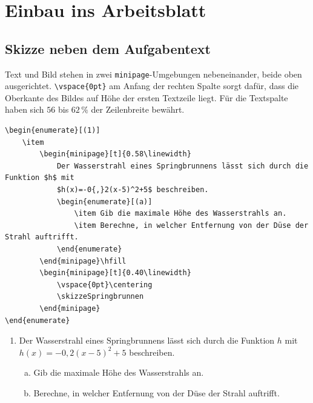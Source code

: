 \section{Einbau ins Arbeitsblatt}


\subsection{Skizze neben dem Aufgabentext}

Text und Bild stehen in zwei \texttt{minipage}-Umgebungen nebeneinander, beide oben ausgerichtet. \texttt{\textbackslash vspace\{0pt\}} am Anfang der rechten Spalte sorgt dafür, dass die Oberkante des Bildes auf Höhe der ersten Textzeile liegt. Für die Textspalte haben sich $56$ bis $62\,\%$ der Zeilenbreite bewährt.

\begin{lstlisting}[style=latex]
\begin{enumerate}[(1)]
	\item
		\begin{minipage}[t]{0.58\linewidth}
			Der Wasserstrahl eines Springbrunnens lässt sich durch die Funktion $h$ mit
			$h(x)=-0{,}2(x-5)^2+5$ beschreiben.
			\begin{enumerate}[(a)]
				\item Gib die maximale Höhe des Wasserstrahls an.
				\item Berechne, in welcher Entfernung von der Düse der Strahl auftrifft.
			\end{enumerate}
		\end{minipage}\hfill
		\begin{minipage}[t]{0.40\linewidth}
			\vspace{0pt}\centering
			\skizzeSpringbrunnen
		\end{minipage}
\end{enumerate}
\end{lstlisting}

\begin{ausgabe}
	\begin{enumerate}[(1)]
		\item
			\begin{minipage}[t]{0.58\linewidth}
				Der Wasserstrahl eines Springbrunnens lässt sich durch die Funktion $h$ mit
				$h(x)=-0{,}2(x-5)^2+5$ beschreiben.
				\begin{enumerate}[(a)]
					\item Gib die maximale Höhe des Wasserstrahls an.
					\item Berechne, in welcher Entfernung von der Düse der Strahl auftrifft.
				\end{enumerate}
			\end{minipage}\hfill
			\begin{minipage}[t]{0.40\linewidth}
				\vspace{0pt}\centering
				\skizzeSpringbrunnen
			\end{minipage}
	\end{enumerate}
\end{ausgabe}



